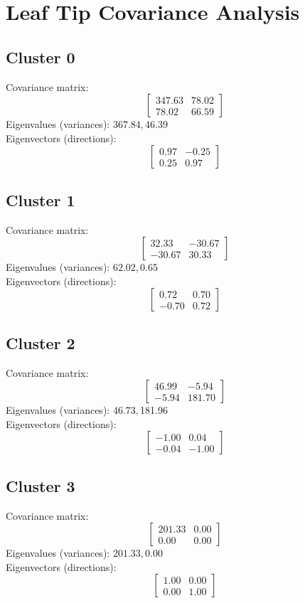 \documentclass{article}
\begin{document}
\section*{Leaf Tip Covariance Analysis}
\subsection*{Cluster 0}
Covariance matrix:
\[\begin{bmatrix}347.63 & 78.02 \\78.02 & 66.59\end{bmatrix}\]
Eigenvalues (variances): $ 367.84, $46.39\\
Eigenvectors (directions):
\[\begin{bmatrix}0.97 & -0.25 \\0.25 & 0.97\end{bmatrix}\]
\subsection*{Cluster 1}
Covariance matrix:
\[\begin{bmatrix}32.33 & -30.67 \\-30.67 & 30.33\end{bmatrix}\]
Eigenvalues (variances): $ 62.02, $0.65\\
Eigenvectors (directions):
\[\begin{bmatrix}0.72 & 0.70 \\-0.70 & 0.72\end{bmatrix}\]
\subsection*{Cluster 2}
Covariance matrix:
\[\begin{bmatrix}46.99 & -5.94 \\-5.94 & 181.70\end{bmatrix}\]
Eigenvalues (variances): $ 46.73, $181.96\\
Eigenvectors (directions):
\[\begin{bmatrix}-1.00 & 0.04 \\-0.04 & -1.00\end{bmatrix}\]
\subsection*{Cluster 3}
Covariance matrix:
\[\begin{bmatrix}201.33 & 0.00 \\0.00 & 0.00\end{bmatrix}\]
Eigenvalues (variances): $ 201.33, $0.00\\
Eigenvectors (directions):
\[\begin{bmatrix}1.00 & 0.00 \\0.00 & 1.00\end{bmatrix}\]
\end{document}
